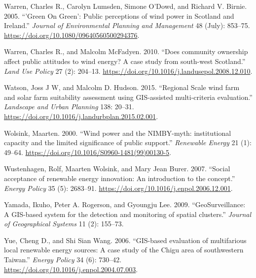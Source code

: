 \documentclass[a4paper,]{article}
\theoremstyle{definition}
\theoremstyle{definition}
\theoremstyle{definition}
\theoremstyle{remark}
\begin{document}
\leavevmode\hypertarget{ref-Warren2005}{}%
Warren, Charles R., Carolyn Lumsden, Simone O'Dowd, and Richard V.
Birnie. 2005. ``'Green On Green': Public perceptions of wind power in
Scotland and Ireland.'' \emph{Journal of Environmental Planning and
Management} 48 (July): 853--75.
\url{https://doi.org/10.1080/09640560500294376}.

\leavevmode\hypertarget{ref-Warren2010}{}%
Warren, Charles R., and Malcolm McFadyen. 2010. ``Does community
ownership affect public attitudes to wind energy? A case study from
south-west Scotland.'' \emph{Land Use Policy} 27 (2): 204--13.
\url{https://doi.org/10.1016/j.landusepol.2008.12.010}.

\leavevmode\hypertarget{ref-Watson2015}{}%
Watson, Joss J W, and Malcolm D. Hudson. 2015. ``Regional Scale wind
farm and solar farm suitability assessment using GIS-assisted
multi-criteria evaluation.'' \emph{Landscape and Urban Planning} 138:
20--31. \url{https://doi.org/10.1016/j.landurbplan.2015.02.001}.

\leavevmode\hypertarget{ref-Wolsink2000}{}%
Wolsink, Maarten. 2000. ``Wind power and the NIMBY-myth: institutional
capacity and the limited significance of public support.''
\emph{Renewable Energy} 21 (1): 49--64.
\url{https://doi.org/10.1016/S0960-1481(99)00130-5}.

\leavevmode\hypertarget{ref-Wustenhagen2007}{}%
Wustenhagen, Rolf, Maarten Wolsink, and Mary Jean Burer. 2007. ``Social
acceptance of renewable energy innovation: An introduction to the
concept.'' \emph{Energy Policy} 35 (5): 2683--91.
\url{https://doi.org/10.1016/j.enpol.2006.12.001}.

\leavevmode\hypertarget{ref-Yamada2009}{}%
Yamada, Ikuho, Peter A. Rogerson, and Gyoungju Lee. 2009.
``GeoSurveillance: A GIS-based system for the detection and monitoring
of spatial clusters.'' \emph{Journal of Geographical Systems} 11 (2):
155--73.

\leavevmode\hypertarget{ref-Yue2006}{}%
Yue, Cheng D., and Shi Sian Wang. 2006. ``GIS-based evaluation of
multifarious local renewable energy sources: A case study of the Chigu
area of southwestern Taiwan.'' \emph{Energy Policy} 34 (6): 730--42.
\url{https://doi.org/10.1016/j.enpol.2004.07.003}.

\newpage
\end{document}
